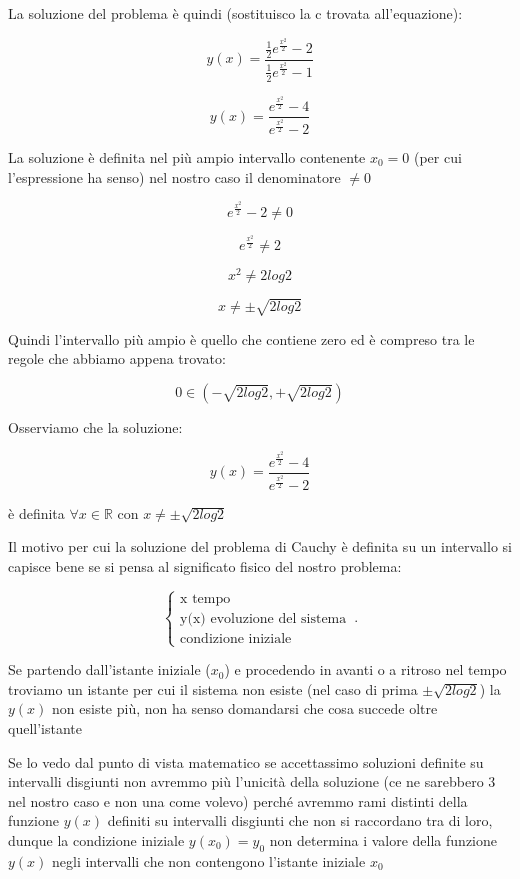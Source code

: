 \documentclass[11pt]{article}
\begin{document}
La soluzione del problema è quindi (sostituisco la c trovata all'equazione):

\[
    y(x) = \frac{\frac{1}{2} e ^{\frac{x ^{2}}{2} }-2}{\frac{1}{2} e ^{\frac{x ^{2}}{2} }-1} 
\]

\[
    y(x) = \frac{ e ^{\frac{x ^{2}}{2} }-4}{ e ^{\frac{x ^{2}}{2} }-2} 
\]

La soluzione è definita nel più ampio intervallo contenente $x_0 = 0 $ (per cui l'espressione ha senso) nel nostro caso il denominatore $\neq 0$

\[
    e ^{\frac{x ^{2}}{2} } - 2 \neq 0
\]

\[
    e ^{\frac{x ^{2}}{2} }  \neq 2
\]

\[
    x ^{2} \neq 2 log 2
\]

\[
    x \neq \pm \sqrt{2 log2}
\]

Quindi l'intervallo più ampio è quello che contiene zero ed è compreso tra le regole che abbiamo appena trovato:

\[
    0 \in (-\sqrt{2log2},+\sqrt{2log2}) 
\]

Osserviamo che la soluzione:

\[
    y(x) = \frac{ e ^{\frac{x ^{2}}{2} }-4}{ e ^{\frac{x ^{2}}{2} }-2} 
\]

è definita $\forall x \in \mathbb{R}$ con $x \neq \pm \sqrt{2log2}$


Il motivo per cui la soluzione del problema di Cauchy è definita su un intervallo si capisce bene se si pensa al significato fisico del nostro problema:

\begin{equation}
    \begin{cases}
        \text{x tempo}\\
        \text{y(x) evoluzione del sistema}\\
        \text{condizione iniziale}
    \end{cases}\,.
\end{equation}

Se partendo dall'istante iniziale ($x_0$) e procedendo in avanti o a ritroso nel tempo troviamo un istante per cui il sistema non esiste (nel caso di prima $\pm \sqrt{2log2}$) la $y(x)$ non esiste più, non ha senso domandarsi che cosa succede oltre quell'istante

Se lo vedo dal punto di vista matematico se accettassimo soluzioni definite su intervalli disgiunti non avremmo più l'unicità della soluzione (ce ne sarebbero 3 nel nostro caso e non una come volevo) perché avremmo rami distinti della funzione $y(x)$ definiti su intervalli disgiunti che non si raccordano tra di loro, dunque la condizione iniziale $y(x_0) = y_0$ non determina i valore della funzione $y(x)$ negli intervalli che non contengono l'istante iniziale $x_0$
\end{document}
